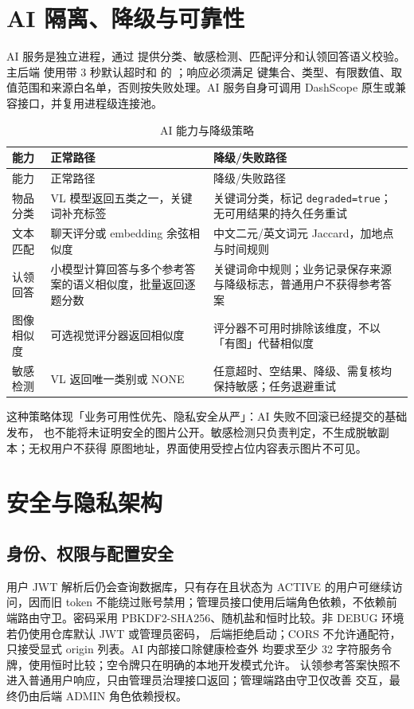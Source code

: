 \section{AI 隔离、降级与可靠性}

AI 服务是独立进程，通过  提供分类、敏感检测、匹配评分和认领回答语义校验。主后端
使用带 3 秒默认超时和  的 ；响应必须满足
键集合、类型、有限数值、取值范围和来源白名单，否则按失败处理。AI 服务自身可调用
DashScope 原生或兼容接口，并复用进程级连接池。

\begin{longtable}{L{3.1cm} L{5.6cm} L{6.0cm}}
  \caption{AI 能力与降级策略}\label{tab:ai-fallback}\\
  \toprule
  能力 & 正常路径 & 降级/失败路径 \\
  \midrule
  \endfirsthead
  \toprule
  能力 & 正常路径 & 降级/失败路径 \\
  \midrule
  \endhead
  物品分类 & VL 模型返回五类之一，关键词补充标签 & 关键词分类，标记 \texttt{degraded=true}；无可用结果的持久任务重试 \\
  文本匹配 & 聊天评分或 embedding 余弦相似度 & 中文二元/英文词元 Jaccard，加地点与时间规则 \\
  认领回答 & 小模型计算回答与多个参考答案的语义相似度，批量返回逐题分数 & 关键词命中规则；业务记录保存来源与降级标志，普通用户不获得参考答案 \\
  图像相似度 & 可选视觉评分器返回相似度 & 评分器不可用时排除该维度，不以「有图」代替相似度 \\
  敏感检测 & VL 返回唯一类别或 NONE & 任意超时、空结果、降级、需复核均保持敏感；任务退避重试 \\
  \bottomrule
\end{longtable}

这种策略体现「业务可用性优先、隐私安全从严」：AI 失败不回滚已经提交的基础发布，
也不能将未证明安全的图片公开。敏感检测只负责判定，不生成脱敏副本；无权用户不获得
原图地址，界面使用受控占位内容表示图片不可见。

\section{安全与隐私架构}

\subsection{身份、权限与配置安全}

用户 JWT 解析后仍会查询数据库，只有存在且状态为 ACTIVE 的用户可继续访问，因而旧
token 不能绕过账号禁用；管理员接口使用后端角色依赖，不依赖前端路由守卫。密码采用
PBKDF2-SHA256、随机盐和恒时比较。非 DEBUG 环境若仍使用仓库默认 JWT 或管理员密码，
后端拒绝启动；CORS 不允许通配符，只接受显式 origin 列表。AI 内部接口除健康检查外
均要求至少 32 字符服务令牌，使用恒时比较；空令牌只在明确的本地开发模式允许。
认领参考答案快照不进入普通用户响应，只由管理员治理接口返回；管理端路由守卫仅改善
交互，最终仍由后端 ADMIN 角色依赖授权。

